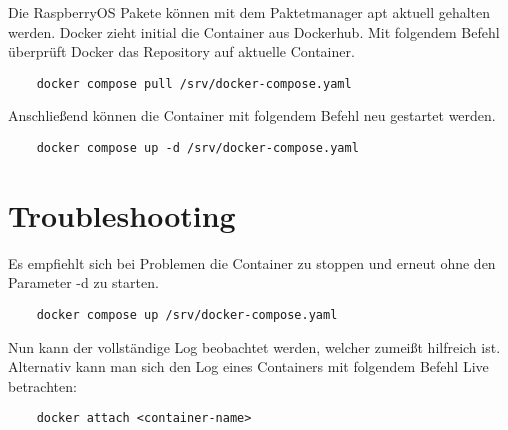 Die RaspberryOS Pakete können mit dem Paktetmanager apt aktuell gehalten werden. Docker zieht initial die Container aus Dockerhub.
Mit folgendem Befehl überprüft Docker das Repository auf aktuelle Container.

\begin{lstlisting}
    docker compose pull /srv/docker-compose.yaml
\end{lstlisting}

Anschließend können die Container mit folgendem Befehl neu gestartet werden.

\begin{lstlisting}
    docker compose up -d /srv/docker-compose.yaml
\end{lstlisting}

\section{Troubleshooting}

Es empfiehlt sich bei Problemen die Container zu stoppen und erneut ohne den Parameter -d zu starten.

\begin{lstlisting}
    docker compose up /srv/docker-compose.yaml
\end{lstlisting}

Nun kann der vollständige Log beobachtet werden, welcher zumeißt hilfreich ist.
Alternativ kann man sich den Log eines Containers mit folgendem Befehl Live betrachten:

\begin{lstlisting}
    docker attach <container-name>
\end{lstlisting}







